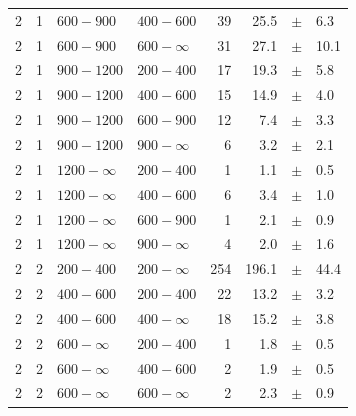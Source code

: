 \begin{table}[!h]
\begin{tabular}{rrllrrcl}
		2 & 1 & $ 600- 900$ & $400-600$ &     39 &     25.5 &$\pm$&    6.3 \\
		2 & 1 & $ 600- 900$ & $600-\infty$ &     31 &     27.1 &$\pm$&   10.1 \\
		2\T & 1 & $ 900-1200$ & $200-400$ &     17 &     19.3 &$\pm$&    5.8 \\
		2 & 1 & $ 900-1200$ & $400-600$ &     15 &     14.9 &$\pm$&    4.0 \\
		2 & 1 & $ 900-1200$ & $600-900$ &     12 &      7.4 &$\pm$&    3.3 \\
		2 & 1 & $ 900-1200$ & $900-\infty$ &      6 &      3.2 &$\pm$&    2.1 \\
		2\T & 1 & $1200- \infty$ & $200-400$ &      1 &      1.1 &$\pm$&    0.5 
		\\
		2 & 1 & $1200- \infty$ & $400-600$ &      6 &      3.4 &$\pm$&    1.0 \\
		2 & 1 & $1200- \infty$ & $600-900$ &      1 &      2.1 &$\pm$&    0.9 \\
		2 & 1 & $1200- \infty$ & $900-\infty$ &      4 &      2.0 &$\pm$&    
		1.6 \\
		2\T & 2 & $ 200- 400$ & $200-\infty$ &    254 &    196.1 &$\pm$&   44.4 
		\\
		2\T & 2 & $ 400- 600$ & $200-400$ &     22 &     13.2 &$\pm$&    3.2 \\
		2 & 2 & $ 400- 600$ & $400-\infty$ &     18 &     15.2 &$\pm$&    3.8 \\
		2\T & 2 & $ 600- \infty$ & $200-400$ &      1 &      1.8 &$\pm$&    0.5 
		\\
		2 & 2 & $ 600- \infty$ & $400-600$ &      2 &      1.9 &$\pm$&    0.5 \\
		2 & 2 & $ 600- \infty$ & $600-\infty$ &      2 &      2.3 &$\pm$&    
		0.9 \\
		\hline
	\end{tabular}
\end{table}

